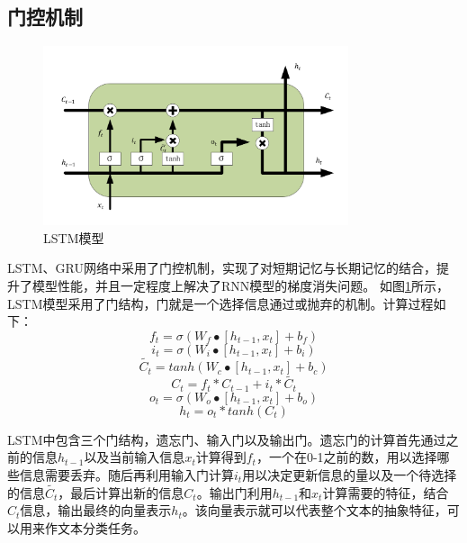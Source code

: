 \subsection{门控机制}
\begin{figure}[htb]%
	\setlength{\belowcaptionskip}{0pt}
	\centering
	\includegraphics[width=0.8\textwidth]{pic/2-14.png}
	\caption{LSTM模型}
	\label{lstm}
\end{figure}
LSTM、GRU网络中采用了门控机制，实现了对短期记忆与长期记忆的结合，提升了模型性能，并且一定程度上解决了RNN模型的梯度消失问题。
如图\ref{lstm}所示，LSTM模型采用了门结构，门就是一个选择信息通过或抛弃的机制。计算过程如下：
\begin{equation}\label{LSTMFormula1}
	f_t=\sigma(W_f\bullet\left[h_{t-1},x_t\right]+b_f)
\end{equation}
\begin{equation}\label{LSTMFormula2}
	i_t=\sigma\left(W_i\bullet\left[h_{t-1},x_t\right]+b_i\right)
\end{equation}
\begin{equation}\label{LSTMFormula3}
	\widetilde{C_t}=tanh\left(W_c\bullet\left[h_{t-1},x_t\right]+b_c\right)
\end{equation}
\begin{equation}\label{LSTMFormula4}
	C_t=f_t\ast C_{t-1}+i_t\ast \widetilde{C_t}
\end{equation}
\begin{equation}\label{LSTMFormula5}
	o_t=\sigma\left(W_o\bullet\left[h_{t-1},x_t\right]+b_o\right)
\end{equation}
\begin{equation}\label{LSTMFormula6}
	h_t=o_t\ast tanh\left(C_t\right)
\end{equation}

LSTM中包含三个门结构，遗忘门、输入门以及输出门。遗忘门的计算首先通过之前的信息$h_{t-1}$以及当前输入信息$x_t$计算得到$f_t$，一个在0-1之前的数，用以选择哪些信息需要丢弃。随后再利用输入门计算$i_t$用以决定更新信息的量以及一个待选择的信息$\widetilde{C_t}$，最后计算出新的信息$C_t$。输出门利用$h_{t-1}$和$x_t$计算需要的特征，结合$C_t$信息，输出最终的向量表示$h_t$。该向量表示就可以代表整个文本的抽象特征，可以用来作文本分类任务。
